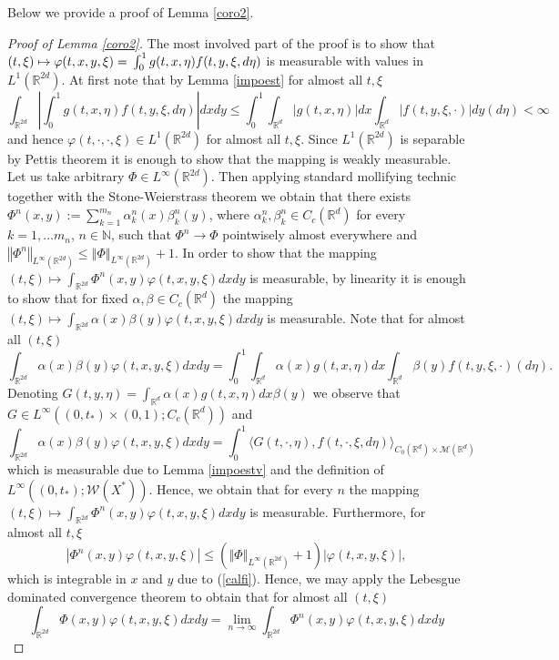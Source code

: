 \documentclass[10pt]{article}
\newcommand{\eqq}[2]{\begin{equation}  #1  \label{#2}\end{equation}    }
\newcommand*{\norm}[1]{\left\Vert{#1}\right\Vert}
\newcommand*{\abs}[1]{\left\vert{#1}\right\vert}
\newcommand{\vf}{\varphi}
\newcommand{\R}{\mathbb{R}}
\newcommand{\izj}{\int_{0}^{1}}
\newcommand{\ird}{\int_{\mathbb{R}^d}}
\newcommand{\al}{\alpha}
\newcommand{\W}{\mathcal{W}}
\begin{document}
Below we provide a proof of Lemma \ref{coro2}.


\begin{proof}[Proof of Lemma \ref{coro2}]
The most involved part of the proof is to show that $(t,\xi)\mapsto \vf(t,x,y,\xi)=\\ \izj g(t,x,\eta)f(t,y,\xi,d\eta)$ is measurable with values in $L^{1}(\R^{2d})$. At first note that by Lemma \ref{impoest} for almost all $t,\xi$
\eqq{
\int_{\R^{2d}}\abs{\izj g(t,x,\eta)f(t,y,\xi,d\eta)}dx dy \leq \izj \ird |g(t,x,\eta)|dx \ird\abs{ f(t,y,\xi,\cdot)}dy(d\eta) < \infty
}{calfi}
and hence $\vf(t,\cdot,\cdot,\xi) \in L^{1}(\R^{2d})$ for almost all $t,\xi$. Since $L^1(\R^{2d})$ is separable by Pettis theorem it is enough to show that the mapping is weakly measurable. Let us take arbitrary $\Phi \in L^{\infty}(\R^{2d})$. Then applying standard  mollifying technic together with the Stone-Weierstrass theorem we obtain that there exists $\Phi^n(x,y):=\sum_{k=1}^{m_n} \alpha_k^n(x) \beta_k^n(y)$, where $\alpha_k^n, \beta_k^n \in C_{c}(\R^d)$ for every $k=1,\dots m_n$, $n\in \mathbb{N}$, such that $\Phi^n \rightarrow \Phi$ pointwisely almost everywhere and $\norm{\Phi^n}_{L^{\infty}(\R^{2d})} \leq \norm{\Phi}_{L^{\infty}(\R^{2d})} + 1$. In order to show that the mapping $
(t,\xi)\mapsto \int_{\R^{2d}}\Phi^{n}(x,y) \vf(t,x,y,\xi)dxdy$ is measurable, by linearity it is enough to show that for fixed $\al,\beta \in C_{c}(\R^d)$ the mapping  $
(t,\xi)\mapsto \int_{\R^{2d}}\al(x)\beta(y) \vf(t,x,y,\xi)dxdy$ is measurable.
Note that for almost all $(t,\xi)$
\[
\int_{\R^{2d}}\al(x)\beta(y) \vf(t,x,y,\xi)dxdy = \izj \ird \al(x)g(t,x,\eta)dx \ird \beta(y)f(t,y,\xi,\cdot)(d\eta).
\]
Denoting $G(t,y,\eta) = \ird \al(x)g(t,x,\eta)dx \beta (y)$ we observe that $G \in L^{\infty}((0,t_{*})
\times (0,1);C_{c}(\R^d))$ and 
\[
\int_{\R^{2d}}\al(x)\beta(y) \vf(t,x,y,\xi)dxdy = \izj \langle G(t,\cdot,\eta),f(t,\cdot,\xi,d\eta) \rangle_{C_0(\R^d) \times \mathcal{M}(\R^d)}
\]
which is measurable due to Lemma \ref{impoestv} and the definition of $L^{\infty}((0,t_{*});\W(X^{*}))$. Hence, we obtain that for every $n$ the mapping $
(t,\xi)\mapsto \int_{\R^{2d}}\Phi^{n}(x,y) \vf(t,x,y,\xi)dxdy$ is measurable. Furthermore, for almost all $t,\xi$
\[
\abs{\Phi^{n}(x,y) \vf(t,x,y,\xi)} \leq (\norm{\Phi}_{L^{\infty}(\R^{2d})} +1)\abs{\vf(t,x,y,\xi)},
\]
which is integrable in $x$ and $y$ due to (\ref{calfi}). Hence, we may apply the Lebesgue dominated convergence theorem to obtain that for almost all $(t,\xi)$
\[
\int_{\R^{2d}} \Phi(x,y)\vf(t,x,y,\xi)dxdy = \lim_{n\rightarrow \infty} \int_{\R^{2d}} \Phi^n(x,y)\vf(t,x,y,\xi)dxdy 
\]
\end{proof}
\end{document}
